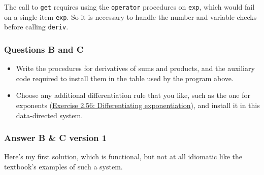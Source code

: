 \documentclass[final,fleqn,titlepage,twoside]{article}
\begin{document}
The call to \texttt{get} requires using the \texttt{operator} procedures on \texttt{exp}, which would
fail on a single-item \texttt{exp}. So it is necessary to handle the number and
variable checks before calling \texttt{deriv}.

\subsubsection{Questions B and C}
\label{sec:org321273c}
\begin{itemize}
\item Write the procedures for derivatives of sums and products, and the auxiliary
code required to install them in the table used by the program above.
\item Choose any additional differentiation rule that you like, such as the one for
exponents (\hyperref[sec:org30ff1f7]{Exercise 2.56: Differentiating exponentiation}), and install it in
this data-directed system.
\end{itemize}

\subsubsection{Answer B \& C version 1}
\label{sec:orgef530ee}
Here's my first solution, which is functional, but not at all idiomatic like the textbook's examples of such a system.
\end{document}
